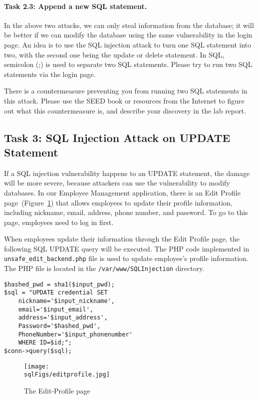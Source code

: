 \paragraph{Task 2.3: Append a new SQL statement.}  
In the above two attacks, we can only steal information from the database;
it will be better if we can modify the database using the same
vulnerability in the login page.  An idea is to use the SQL injection
attack to turn one SQL statement into two, with the second one being the
update or delete statement. In SQL, semicolon (;) is used to separate two SQL
statements. Please try to run two SQL statements via the login page. 

There is a countermeasure preventing you from running two
SQL statements in this attack. Please use the SEED book 
or resources from the Internet to figure out what this 
countermeasure is, and describe your discovery in the lab report. 



\subsection{Task 3: SQL Injection Attack on UPDATE Statement} 

If a SQL injection vulnerability happens to an UPDATE statement, the damage will be more
severe, because attackers can use the vulnerability to modify databases. 
In our Employee Management application, there is an Edit Profile page~(Figure~\ref{sql:fig:edit}) 
that allows employees to
update their profile information, including nickname, email, address, phone number, and
password. To go to this page, employees need to log in first. 


When employees update their information through the Edit Profile page, the
following SQL UPDATE query will be executed. The PHP code implemented in
{\tt unsafe\_edit\_backend.php} file is used to update employee's profile
information. The PHP file is located in the {\tt /var/www/SQLInjection}
directory.


\begin{lstlisting}
$hashed_pwd = sha1($input_pwd);
$sql = "UPDATE credential SET
	nickname='$input_nickname',
	email='$input_email',
	address='$input_address',
	Password='$hashed_pwd',
	PhoneNumber='$input_phonenumber'
	WHERE ID=$id;";
$conn->query($sql);
\end{lstlisting}
 

\begin{figure}[htb]
\begin{center}
  \texttt{[image: \\sqlFigs/editprofile.jpg]}
\end{center}
\caption{The Edit-Profile page}
\label{sql:fig:edit}
\end{figure}
 


